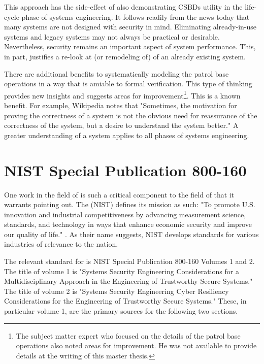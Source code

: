 \documentclass[../../main/main.tex]{subfiles}
\begin{document}
This approach has the side-effect of also demonstrating CSBDs utility in the life-cycle phase of systems engineering.  It follows readily from the news today that many systems are not designed with security in mind.  Eliminating already-in-use systems and legacy systems may not always be practical or desirable.  Nevertheless, security remains an important aspect of system performance.  This, in part, justifies a re-look at (or remodeling of)  of an already existing system.


There are additional benefits to systematically modeling the patrol base operations in a way that is amiable to formal verification.  This type of thinking provides new insights and suggests areas for improvement\footnote{The subject matter expert who focused on the details of the patrol base operations also noted areas for improvement.  He was not available to provide details at the writing of this master thesis.}.  This is a known benefit.  For example, Wikipedia \cite{wikiformalmethods} notes that "Sometimes, the motivation for proving the correctness of a system is not the obvious need for reassurance of the correctness of the system, but a desire to understand the system better."  A greater understanding of a system applies to all phases of systems engineering.

\section{NIST Special Publication 800-160}
One work in the field of  is such a critical component to the field of  that it warrants pointing out. The  (NIST) defines its mission as such: "To promote U.S. innovation and industrial competitiveness by advancing measurement science, standards, and technology in ways that enhance economic security and improve our quality of life." \cite{nistmission}.  As their name suggests, NIST develops standards for various industries of relevance to the nation.   

The relevant standard for  is NIST Special Publication 800-160 Volumes 1 and 2. The title of volume 1 is "Systems Security Engineering
Considerations for a Multidisciplinary Approach in the Engineering of Trustworthy Secure Systems."  The title of volume 2 is "Systems Security Engineering Cyber Resiliency Considerations for the Engineering of Trustworthy Secure Systems."   These, in particular volume 1, are the primary sources for the following two sections.  
\end{document}
